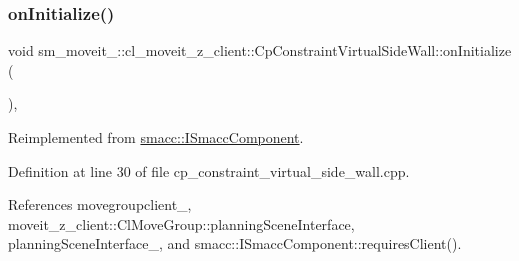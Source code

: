 \subsubsection{\texorpdfstring{on\+Initialize()}{onInitialize()}}
{\footnotesize\ttfamily void sm\+\_\+moveit\+\_\+::cl\+\_\+moveit\+\_\+z\+\_\+client\+::\+Cp\+Constraint\+Virtual\+Side\+Wall\+::on\+Initialize (\begin{DoxyParamCaption}{ }\end{DoxyParamCaption})\hspace{0.3cm}{\ttfamily [override]}, {\ttfamily [virtual]}}



Reimplemented from \hyperlink{classsmacc_1_1ISmaccComponent_ae6f71d008db12553912e9436184b9e65}{smacc\+::\+I\+Smacc\+Component}.



Definition at line 30 of file cp\+\_\+constraint\+\_\+virtual\+\_\+side\+\_\+wall.\+cpp.



References movegroupclient\+\_\+, moveit\+\_\+z\+\_\+client\+::\+Cl\+Move\+Group\+::planning\+Scene\+Interface, planning\+Scene\+Interface\+\_\+, and smacc\+::\+I\+Smacc\+Component\+::requires\+Client().


